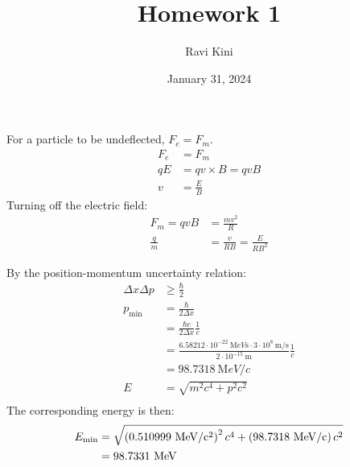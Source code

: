 \documentclass{article}
\title{Homework 1}
\author{Ravi Kini}
\date{January 31, 2024}
\begin{document}
\maketitle


For a particle to be undeflected, $F_e = F_m$.
\begin{equation}
    \begin{split}
        F_e & = F_m \\
        qE & = qv \times B = qvB \\
        v & = \frac{E}{B}
    \end{split}
\end{equation}
Turning off the electric field:
\begin{equation}
    \begin{split}
        F_m = qvB & = \frac{mv^2}{R} \\
        \frac{q}{m} & = \frac{v}{RB} = \frac{E}{RB^2}
    \end{split}
\end{equation}
\clearpage

By the position-momentum uncertainty relation:
\begin{equation}
    \begin{split}
        \Delta x\Delta p & \geq \frac{\hbar}{2} \\
        p_{\text{min}} & = \frac{\hbar}{2\Delta x} \\
        & = \frac{\hbar c}{2\Delta x} \frac{1}{c} \\
        & = \frac{6.58212 \cdot 10^{-22}~\unit{\mega eV\second} \cdot 3 \cdot 10^8~\unit{\meter\per\second}}{2 \cdot 10^{-15}~\unit{\meter}} \frac{1}{c} \\
        & = 98.7318~\unit{\mega eV\per c} \\
        E & = \sqrt{m^2c^4 + p^2c^2} \\
    \end{split}
\end{equation}
The corresponding energy is then:
\begin{equation}
    \begin{split}
        E_{\text{min}} & = \sqrt{\left(0.510999~\unit{\mega eV\per c\squared}\right)^2c^4 + \left(98.7318~\unit{\mega eV\per c}\right)c^2} \\
        & = 98.7331~\unit{\mega eV}
    \end{split}
\end{equation}
\clearpage
\end{document}
